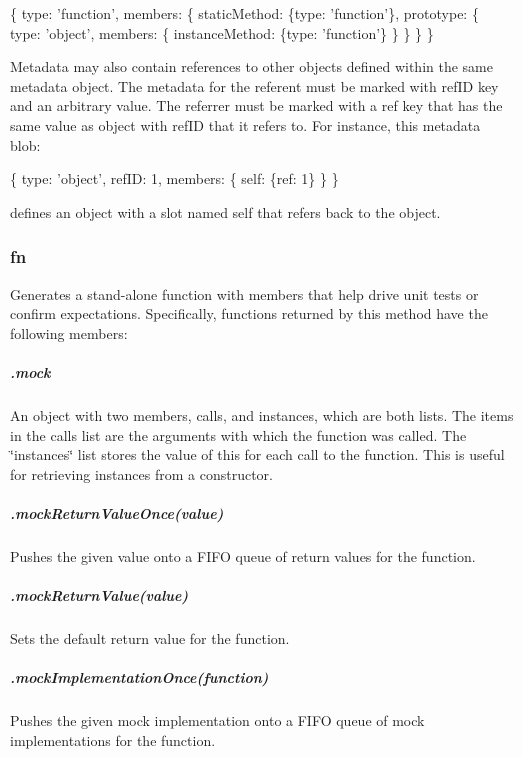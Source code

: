 \begin{DoxyCode}
\{
  type: 'function',
  members: \{
    staticMethod: \{type: 'function'\},
    prototype: \{
      type: 'object',
      members: \{
        instanceMethod: \{type: 'function'\}
      \}
    \}
  \}
\}
\end{DoxyCode}


Metadata may also contain references to other objects defined within the same metadata object. The metadata for the referent must be marked with {\ttfamily ref\+ID} key and an arbitrary value. The referrer must be marked with a {\ttfamily ref} key that has the same value as object with ref\+ID that it refers to. For instance, this metadata blob\+:


\begin{DoxyCode}
\{
  type: 'object',
  refID: 1,
  members: \{
    self: \{ref: 1\}
  \}
\}
\end{DoxyCode}


defines an object with a slot named {\ttfamily self} that refers back to the object.

\subsubsection*{{\ttfamily fn}}

Generates a stand-\/alone function with members that help drive unit tests or confirm expectations. Specifically, functions returned by this method have the following members\+:

\subparagraph*{{\ttfamily .mock}}

An object with two members, {\ttfamily calls}, and {\ttfamily instances}, which are both lists. The items in the {\ttfamily calls} list are the arguments with which the function was called. The \char`\"{}instances\char`\"{} list stores the value of \textquotesingle{}this\textquotesingle{} for each call to the function. This is useful for retrieving instances from a constructor.

\subparagraph*{{\ttfamily .mock\+Return\+Value\+Once(value)}}

Pushes the given value onto a F\+I\+FO queue of return values for the function.

\subparagraph*{{\ttfamily .mock\+Return\+Value(value)}}

Sets the default return value for the function.

\subparagraph*{{\ttfamily .mock\+Implementation\+Once(function)}}

Pushes the given mock implementation onto a F\+I\+FO queue of mock implementations for the function.


